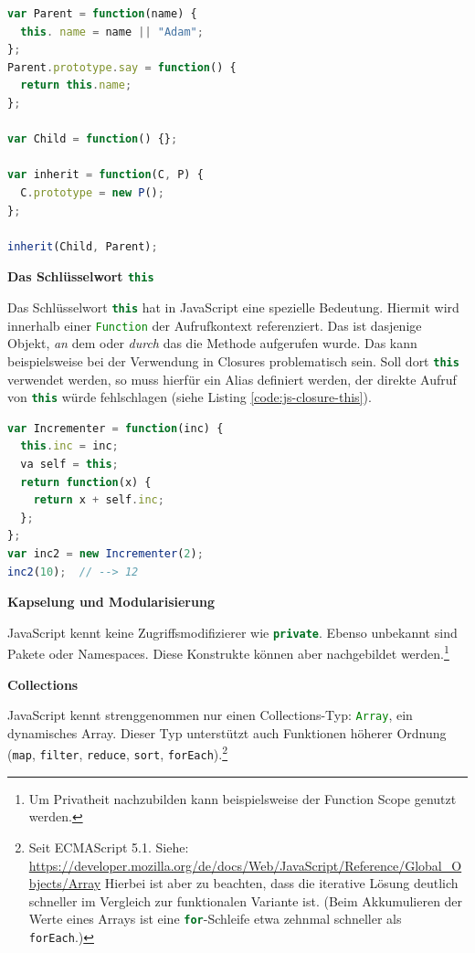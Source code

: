 \documentclass[a4paper, 12pt, hidelinks, listof=totoc, listoftables=totoc, bibliography=totoc]{scrreprt}
\newcommand{\code}[1]{\lstinline[language=Scala, style=inline]|#1|}
\newcommand{\js}[1]{\lstinline[language=JavaScript, style=inline]|#1|}
\newcommand{\MyMiniSec}[1]{\rmfamily\fontsize{12}{15}\selectfont
	\vspace{7pt}\textbf{#1} %
}
\begin{document}
\begin{lstlisting}[language=JavaScript, caption={[Ein mögliches Vererbungsmuster mit Klassen in JavaScript.] Vererbungsmuster mit Klassen in JavaScript. \protect\cite[Basierend auf:][S. 16 f.]{stefanov2010.JSP} }, label={code:js-class-inherit}]
var Parent = function(name) {
  this. name = name || "Adam";
};
Parent.prototype.say = function() {
  return this.name;
};

var Child = function() {};

var inherit = function(C, P) {
  C.prototype = new P();
};

inherit(Child, Parent);
\end{lstlisting}


\MyMiniSec{Das Schlüsselwort \js{this}}

Das Schlüsselwort \js{this} hat in JavaScript eine spezielle Bedeutung. Hiermit wird innerhalb einer \js{Function} der Aufrufkontext referenziert. Das ist dasjenige Objekt, \emph{an} dem oder \emph{durch} das die Methode aufgerufen wurde. 
\cite[199 ff.]{flanagan2011.JDG} Das kann beispielsweise bei der Verwendung in Closures problematisch sein. Soll dort \js{this} verwendet werden, so muss hierfür ein Alias definiert werden, der direkte Aufruf von \js{this} würde fehlschlagen (siehe Listing \ref{code:js-closure-this}).

\begin{lstlisting}[language=JavaScript, caption={Ein Beispiel für die Verwendung von \js{this} in JavaScript-Closures.}, label={code:js-closure-this}]
var Incrementer = function(inc) {
  this.inc = inc;
  va self = this;
  return function(x) {
    return x + self.inc;
  };
};
var inc2 = new Incrementer(2);
inc2(10);  // --> 12
\end{lstlisting}


\MyMiniSec{Kapselung und Modularisierung}

JavaScript kennt keine Zugriffsmodifizierer wie \code{private}. Ebenso unbekannt sind Pakete oder Namespaces. Diese Konstrukte können aber nachgebildet werden.\footnote{Um Privatheit nachzubilden kann beispielsweise der Function Scope genutzt werden.}


\MyMiniSec{Collections}

JavaScript kennt strenggenommen nur einen Collections-Typ: \js{Array}, ein dynamisches Array. Dieser Typ unterstützt auch Funktionen höherer Ordnung (\js{map}, \js{filter}, \js{reduce}, \js{sort}, \js{forEach}).\footnote{Seit ECMAScript 5.1. Siehe: \url{https://developer.mozilla.org/de/docs/Web/JavaScript/Reference/Global_Objects/Array} Hierbei ist aber zu beachten, dass die iterative Lösung deutlich schneller im Vergleich zur funktionalen Variante ist. (Beim Akkumulieren der Werte eines Arrays ist eine \js{for}-Schleife etwa zehnmal schneller als \js{forEach}.)}
\end{document}
